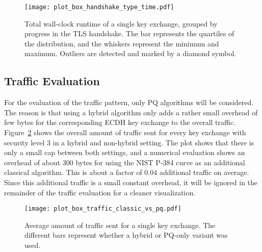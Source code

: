 \begin{figure}[t]
    \centering\texttt{[image: plot\_box\_handshake\_type\_time.pdf]}
    \caption{Total wall-clock runtime of a single key exchange, grouped by progress in the TLS handshake. The bar represents the quartiles of the distribution, and the whiskers represent the minimum and maximum. Outliers are detected and marked by a diamond symbol.}\label{fig:plot_box_handshake_type_time.pdf}
\end{figure}

\subsection{Traffic Evaluation}

For the evaluation of the traffic pattern, only \ac{PQ} algorithms will be considered. The reason is that using a hybrid algorithm only adds a rather small overhead of few bytes for the corresponding \ac{ECDH} key exchange to the overall traffic. Figure~\ref{fig:plot_box_traffic_classic_vs_pq.pdf} shows the overall amount of traffic sent for every key exchange with security level 3 in a hybrid and non-hybrid setting. The plot shows that there is only a small cap between both settings, and a numerical evaluation shows an overhead of about 300 bytes for using the \ac{NIST} P-384 curve as an additional classical algorithm. This is about a factor of \(0.04\) additional traffic on average. Since this additional traffic is a small constant overhead, it will be ignored in the remainder of the traffic evaluation for a cleaner visualization.
\begin{figure}[t]
    \centering\texttt{[image: plot\_box\_traffic\_classic\_vs\_pq.pdf]}
    \caption{Average amount of traffic sent for a single key exchange. The different bars represent whether a hybrid or \ac{PQ}-only variant was used.}\label{fig:plot_box_traffic_classic_vs_pq.pdf}
\end{figure}


